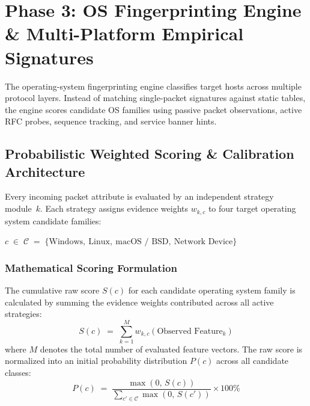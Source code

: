 \section{Phase 3: OS Fingerprinting Engine \& Multi-Platform Empirical Signatures}\label{sec:fp}

The operating-system fingerprinting engine classifies target hosts across multiple protocol layers.
Instead of matching single-packet signatures against static tables, the engine scores candidate OS families
using passive packet observations, active RFC probes, sequence tracking, and service banner hints.

\subsection{Probabilistic Weighted Scoring \& Calibration Architecture}
Every incoming packet attribute is evaluated by an independent strategy module~$k$. Each strategy
assigns evidence weights $w_{k,c}$ to four target operating system candidate families:
\begin{center}
$c \;\in\; \mathcal{C} \;=\; \{\text{Windows}, \ \text{Linux}, \ \text{macOS / BSD}, \ \text{Network Device}\}$
\end{center}

\subsubsection{Mathematical Scoring Formulation}
The cumulative raw score $S(c)$ for each candidate operating system family is calculated by summing the
evidence weights contributed across all active strategies:
\begin{equation}
S(c) \;=\; \sum_{k=1}^{M} w_{k,c}(\text{Observed Feature}_k)
\label{eq:score}
\end{equation}
where $M$ denotes the total number of evaluated feature vectors. The raw score is normalized into an
initial probability distribution $P(c)$ across all candidate classes:
\begin{equation}
P(c) \;=\; \frac{\max(0, \, S(c))}{\sum_{c' \in \mathcal{C}} \max(0, \, S(c'))} \times 100\%
\label{eq:prob}
\end{equation}

